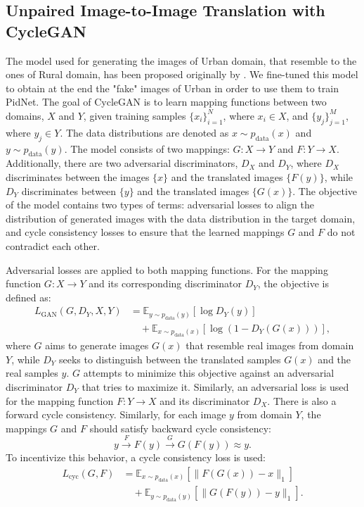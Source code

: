 \documentclass[10pt,twocolumn,letterpaper]{article}
\begin{document}
\subsection{Unpaired Image-to-Image Translation with CycleGAN}
The model used for generating the images of Urban domain, that resemble to the ones of Rural domain, has been proposed originally by \cite{zhu2020cyclegan}. We fine-tuned this model to obtain at the end the "fake" images of Urban in order to use them to train PidNet.
The goal of CycleGAN is to learn mapping functions between two domains, \(X\) and \(Y\), given training samples \(\{ x_i \}_{i=1}^N\), where \(x_i \in X\), and \(\{ y_j \}_{j=1}^M\), where \(y_j \in Y\). The data distributions are denoted as \(x \sim p_{\text{data}}(x)\) and \(y \sim p_{\text{data}}(y)\). The model consists of two mappings: \(G: X \rightarrow Y\) and \(F: Y \rightarrow X\). Additionally, there are two adversarial discriminators, \(D_X\) and \(D_Y\), where \(D_X\) discriminates between the images \(\{ x \}\) and the translated images \(\{ F(y) \}\), while \(D_Y\) discriminates between \(\{ y \}\) and the translated images \(\{ G(x) \}\). The objective of the model contains two types of terms: adversarial losses to align the distribution of generated images with the data distribution in the target domain, and cycle consistency losses to ensure that the learned mappings \(G\) and \(F\) do not contradict each other.

Adversarial losses are applied to both mapping functions. For the mapping function \(G: X \rightarrow Y\) and its corresponding discriminator \(D_Y\), the objective is defined as:
\begin{align}
L_{\text{GAN}}(G, D_Y, X, Y) &= \mathbb{E}_{y \sim p_{\text{data}}(y)} \left[ \log D_Y(y) \right] \nonumber \\
&\quad + \mathbb{E}_{x \sim p_{\text{data}}(x)} \left[ \log(1 - D_Y(G(x))) \right],
\end{align}
where \(G\) aims to generate images \(G(x)\) that resemble real images from domain \(Y\), while \(D_Y\) seeks to distinguish between the translated samples \(G(x)\) and the real samples \(y\). \(G\) attempts to minimize this objective against an adversarial discriminator \(D_Y\) that tries to maximize it.
Similarly, an adversarial loss is used for the mapping function \(F: Y \rightarrow X\) and its discriminator \(D_X\).
There is also a forward cycle consistency. Similarly, for each image \( y \) from domain \( Y \), the mappings \( G \) and \( F \) should satisfy backward cycle consistency:
\[
y \xrightarrow{F} F(y) \xrightarrow{G} G(F(y)) \approx y.
\]
To incentivize this behavior, a cycle consistency loss is used:
\begin{align}
L_{\text{cyc}}(G, F) &= \mathbb{E}_{x \sim p_{\text{data}}(x)} \left[ \| F(G(x)) - x \|_1 \right] \nonumber \\
&\quad + \mathbb{E}_{y \sim p_{\text{data}}(y)} \left[ \| G(F(y)) - y \|_1 \right].
\end{align}
\end{document}
